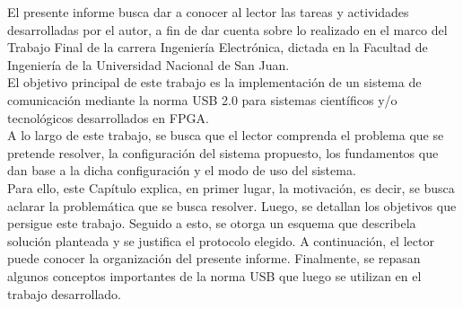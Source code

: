 El presente informe busca dar a conocer al lector las tareas y actividades desarrolladas por el autor, a fin de dar cuenta sobre lo realizado en el marco del Trabajo Final de la carrera Ingeniería Electrónica, dictada en la Facultad de Ingeniería de la Universidad Nacional de San Juan.\\

El objetivo principal de este trabajo es la implementación de un sistema de comunicación mediante la norma USB 2.0 para sistemas científicos y/o tecnológicos desarrollados en FPGA.\\

A lo largo de este trabajo, se busca que el lector comprenda el problema que se pretende resolver, la configuración del sistema propuesto, los fundamentos que dan base a la dicha configuración y el modo de uso del sistema.\\

Para ello, este Capítulo explica, en primer lugar, la motivación, es decir, se busca aclarar la problemática que se busca resolver. Luego, se detallan los objetivos que persigue este trabajo. Seguido a esto, se otorga un esquema que describela solución planteada y se justifica el protocolo elegido. A continuación, el lector puede conocer la organización del presente informe. Finalmente, se repasan algunos conceptos importantes de la norma USB que luego se utilizan en el trabajo desarrollado.\\ 